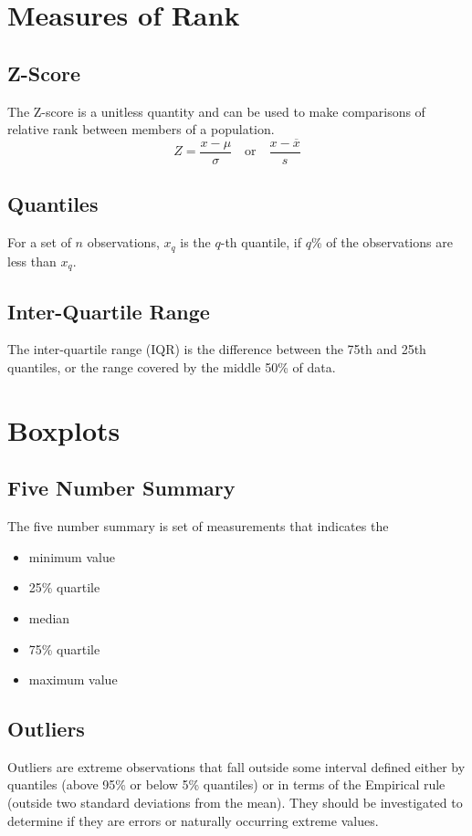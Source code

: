 \documentclass{article}
\begin{document}
\begin{multicols}{3}
\section{Measures of Rank}
\subsection{Z-Score}
The Z-score is a unitless quantity and can be used to make comparisons of relative rank between members of a population.
\begin{equation*}
    Z = \frac{x  - \mu}{\sigma} \quad \text{or} \quad \frac{x - \overline{x}}{s}
\end{equation*}
\subsection{Quantiles}
For a set of \(n\) observations, \(x_q\) is the \(q\)-th quantile, if \(q\)\% of the observations are less than \(x_q\).
\subsection{Inter-Quartile Range}
The inter-quartile range (IQR) is the difference between the 75th and 25th quantiles,
or the range covered by the middle 50\% of data.
\section{Boxplots}
\subsection{Five Number Summary}
The five number summary is set of measurements that indicates the
\begin{itemize}
    \item minimum value
    \item 25\% quartile
    \item median
    \item 75\% quartile
    \item maximum value
\end{itemize}

\subsection{Outliers}
Outliers are extreme observations that fall outside some
interval defined either by quantiles (above 95\% or below 5\% quantiles) or in terms of the Empirical rule
(outside two standard deviations from the mean).
They should be investigated to determine if they are errors or naturally occurring
extreme values.


\end{multicols}
\end{document}

